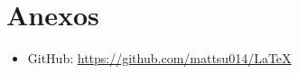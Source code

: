 \section{Anexos}

\begin{itemize}
    \item GitHub: \href{https://github.com/mattsu014/LaTeX}{https://github.com/mattsu014/LaTeX}
\end{itemize}
